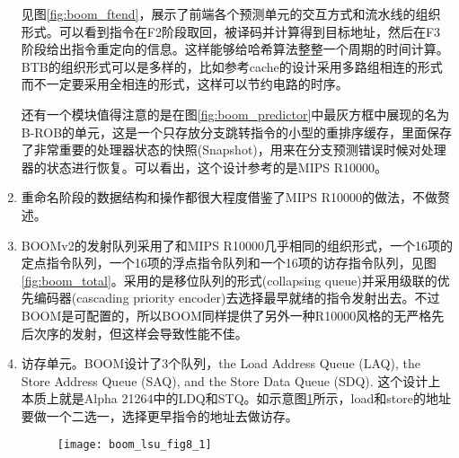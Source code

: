 \begin{enumerate}[label=(\alph*)]
	见图\ref{fig:boom_ftend}，展示了前端各个预测单元的交互方式和流水线的组织形式。可以看到指令在F2阶段取回，被译码并计算得到目标地址，然后在F3阶段给出指令重定向的信息。这样能够给哈希算法整整一个周期的时间计算。BTB的组织形式可以是多样的，比如参考cache的设计采用多路组相连的形式而不一定要采用全相连的形式，这样可以节约电路的时序。
	
	还有一个模块值得注意的是在图\ref{fig:boom_predictor}中最灰方框中展现的名为B-ROB的单元，这是一个只存放分支跳转指令的小型的重排序缓存，里面保存了非常重要的处理器状态的快照(Snapshot)，用来在分支预测错误时候对处理器的状态进行恢复。可以看出，这个设计参考的是MIPS R10000。
	\item 重命名阶段的数据结构和操作都很大程度借鉴了MIPS R10000的做法，不做赘述。
	\item BOOMv2的发射队列采用了和MIPS R10000几乎相同的组织形式，一个16项的定点指令队列，一个16项的浮点指令队列和一个16项的访存指令队列，见图\ref{fig:boom_total}。采用的是移位队列的形式(collapsing queue)并采用级联的优先编码器(cascading priority encoder)去选择最早就绪的指令发射出去\citep{Celio:EECS-2017-157}。不过BOOM是可配置的，所以BOOM同样提供了另外一种R10000风格的无严格先后次序的发射，但这样会导致性能不佳。
	\item 访存单元。BOOM设计了3个队列，the Load Address Queue (LAQ), the Store Address Queue (SAQ), and the Store Data Queue (SDQ)\citep{BOOMDoc2018}. 这个设计上本质上就是Alpha 21264中的LDQ和STQ。如示意图\ref{fig:LSU}所示，load和store的地址要做一个二选一，选择更早指令的地址去做访存。
	\begin{figure}[!htbp]
		\centering
		\texttt{[image: boom\_lsu\_fig8\_1]}
		\label{fig:LSU}
	\end{figure}
\end{enumerate}


